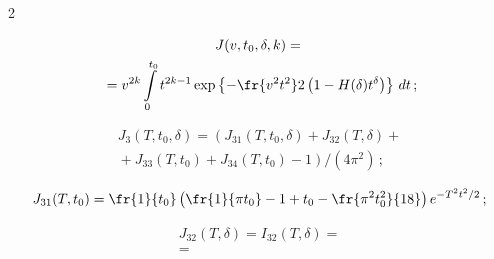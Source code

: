 \begin{multicols}{2}
\noindent


\begin{multline*}


J(v,t_0,\delta,k)={}\\


{}= v^{2k}\int\limits_0^{t_0} t^{2k-1}


\exp\left\{-\fr{v^2t^2}2\left(1-H(\delta)t^{\delta}\right) \right\} \,dt\,;


\end{multline*}





\vspace*{-12pt}





\noindent


\begin{multline*}


J_3(T,t_0,\delta)=


\left (J_{31}(T,t_0,\delta)+


J_{32}(T,\delta)+{}\right.\\


\left.{}+J_{33}(T,t_0)+J_{34}(T,t_0)-1\right )\Big/


(4\pi^2)\,;


\end{multline*}





\vspace*{-12pt}





\noindent


$$


J_{31}(T,t_0)=\fr{1}{t_0}\left(\fr{1}{\pi


t_0}-1+t_0-\fr{\pi^2t_0^2}{18}\right)e^{-T^2t^2/2}\,;


$$





\vspace*{-12pt}





\noindent


\begin{multline*}


J_{32}(T,\delta)=  I_{32}(T,\delta)= {}\\


{}=



\end{multline*}
\end{multicols}
